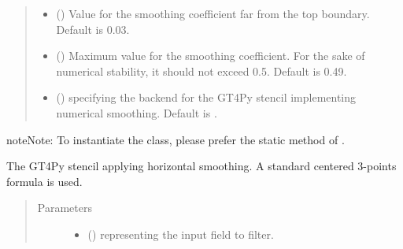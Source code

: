 \documentclass[letterpaper,10pt,english]{sphinxmanual}
\begin{document}
\begin{fulllineitems}
\begin{fulllineitems}
\begin{quote}
\begin{description}
\begin{itemize}
\item {} 
 () \textendash{} Value for the smoothing coefficient far from the top boundary. Default is 0.03.

\item {} 
 () \textendash{} Maximum value for the smoothing coefficient. For the sake of numerical stability, it should not
exceed 0.5. Default is 0.49.

\item {} 
 () \textendash{}  specifying the backend for the GT4Py stencil implementing numerical
smoothing. Default is .

\end{itemize}

\end{description}\end{quote}

\begin{sphinxadmonition}{note}{Note:}
To instantiate the class, please prefer the static method
{\hyperref[\detokenize{api:tasmania.dycore.horizontal_smoothing.HorizontalSmoothing.factory}]{}}
of {\hyperref[\detokenize{api:tasmania.dycore.horizontal_smoothing.HorizontalSmoothing}]{}}.
\end{sphinxadmonition}

\end{fulllineitems}


\begin{fulllineitems}
\label{\detokenize{api:tasmania.dycore.horizontal_smoothing.HorizontalSmoothingFirstOrderYZ._stencil_defs}}
The GT4Py stencil applying horizontal smoothing. A standard centered 3-points formula is used.
\begin{quote}\begin{description}
\item[{Parameters}] \leavevmode\begin{itemize}
\item {} 
 () \textendash{}  representing the input field to filter.


\end{itemize}
\end{description}
\end{quote}
\end{fulllineitems}
\end{fulllineitems}
\end{document}
